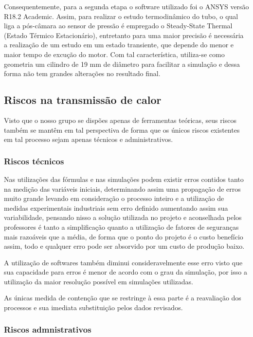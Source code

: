 Consequentemente, para a segunda etapa o software utilizado foi o ANSYS versão R18.2 Academic. Assim, para realizar o estudo termodinâmico do tubo, o qual liga a pós-câmara ao sensor de pressão é empregado o Steady-State Thermal (Estado Térmico Estacionário), entretanto para uma maior precisão é necessária a realização de um estudo em um estado transiente, que depende do menor e maior tempo de excução do motor. Com tal característica, utiliza-se como geometria um cilindro de 19 mm de diâmetro para facilitar a simulação e dessa forma não tem grandes alterações no resultado final.

\subsection{Riscos na transmissão de calor}

Visto que o nosso grupo se dispões apenas de ferramentas teóricas, seus riscos também se mantêm em tal perspectiva de forma que os únicos riscos existentes em tal processo sejam apenas técnicos e administrativos.

\subsubsection{Riscos técnicos}
Nas utilizações das fórmulas e nas simulações podem existir erros contidos tanto na medição das variáveis iniciais, determinando assim uma propagação de erros muito grande levando em consideração o processo inteiro e a utilização de medidas experimentais industriais sem erro definido aumentando assim sua variabilidade, pensando nisso a solução utilizada no projeto e aconselhada pelos professores é tanto a simplificação quanto a utilização de fatores de seguranças mais razoáveis que a média, de forma que o ponto do projeto é o custo benefício assim, todo e qualquer erro pode ser absorvido por um custo de produção baixo.

A utilização de softwares também diminui consideravelmente esse erro visto que sua capacidade para erros é menor de acordo com o grau da simulação, por isso a utilização da maior resolução possível em simulações utilizadas.

As únicas medida de contenção que se restringe à essa parte é a reavaliação dos processos e sua imediata substituição pelos dados revisados.

\subsubsection{Riscos admnistrativos}

